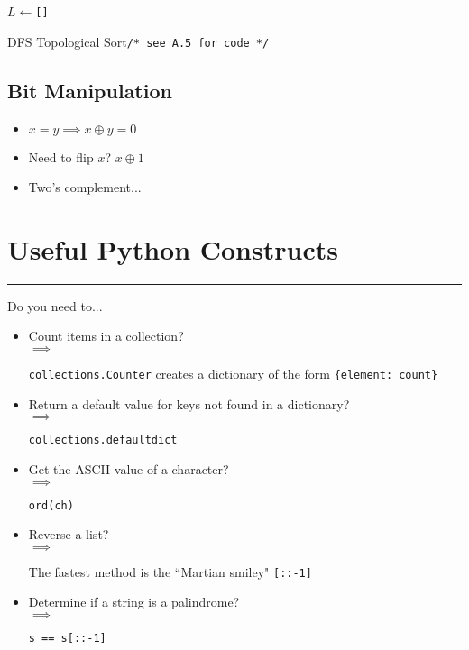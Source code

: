 \documentclass[12pt, titlepage]{article}
\newcommand{\imply}[1]{
  \-\hspace{1em}$\implies$ \parbox[t]{11.2cm}{#1}
}
\begin{document}
\begin{algorithm}[H]
  \SetAlgoLined
  \DontPrintSemicolon
  $L \longleftarrow$\hspace{0.5mm}\texttt{[]}\;
  \;
  \caption{DFS Topological Sort\hspace{8mm}\texttt{/* see A.5 for code */}}
\end{algorithm}

\subsection{Bit Manipulation}

\begin{itemize}
  \item $x = y \implies x \oplus y = 0$
  \item Need to flip $x$? $x \oplus 1$
  \item Two's complement...
\end{itemize}

\section{Useful Python Constructs}
\hrule\vspace{5ex}

Do you need to...
\begin{itemize}
  \item Count items in a collection? \smallskip\\
    \imply{\texttt{collections.Counter} creates a dictionary of the form \texttt{\{element: count\}}}
  \item Return a default value for keys not found in a dictionary? \smallskip\\
    \imply{\texttt{collections.defaultdict}}
  \item Get the ASCII value of a character? \smallskip\\
    \imply{\texttt{ord(ch)}}
  \item Reverse a list? \smallskip\\
    \imply{The fastest method is the ``Martian smiley" \texttt{[::-1]}}
  \item Determine if a string is a palindrome? \smallskip\\
    \imply{\texttt{s == s[::-1]}}
\end{itemize}
\end{document}
